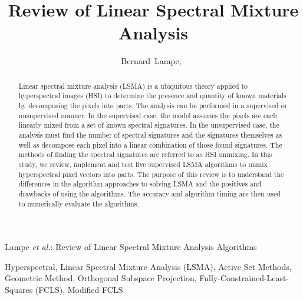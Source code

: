 \documentclass[journal]{IEEEtran}
\begin{document}
\title{Review of Linear Spectral Mixture Analysis}

\author{Bernard~Lampe,~}

{Lampe \MakeLowercase{\textit{et al.}}: Review of Linear Spectral Mixture Analysis Algorithms}

\maketitle

\begin{abstract}
Linear spectral mixture analysis (LSMA) is a ubiquitous theory applied to hyperspectral images (HSI) to determine the presence and quantity of known materials by decomposing the pixels into parts. The analysis can be performed in a supervised or unsupervised manner. In the supervised case, the model assumes the pixels are each linearly mixed from a set of known spectral signatures. In the unsupervised case, the analysis must find the number of spectral signatures and the signatures themselves as well as decompose each pixel into a linear combination of those found signatures. The methods of finding the spectral signatures are referred to as HSI unmixing.  In this study, we review, implement and test five supervised LSMA algorithms to unmix hyperspectral pixel vectors into parts. The purpose of this review is to understand the differences in the algorithm approaches to solving LSMA and the positives and drawbacks of using the algorithms. The accuracy and algorithm timing are then used to numerically evaluate the algorithms.
\end{abstract}

\begin{IEEEkeywords}
Hyperspectral, Linear Spectral Mixture Analysis (LSMA), Active Set Methods, Geometric Method, Orthogonal Subspace Projection, Fully-Constrained-Least-Squares (FCLS), Modified FCLS
\end{IEEEkeywords}
\end{document}
